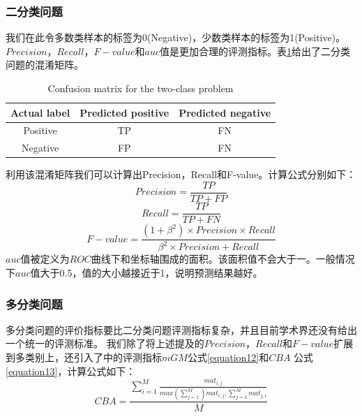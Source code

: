 \documentclass{article}
\begin{document}
\subsubsection{二分类问题}
我们在此令多数类样本的标签为0(Negative)，少数类样本的标签为1(Positive)。
$Precision$，$Recall$，$F-value$和$auc$值是更加合理的评测指标。表\ref{table1}给出了二分类问题的混淆矩阵。
\begin{table}[]
  \caption{Confusion matrix for the two-class problem}
  \label{table1}
  \begin{tabular}{@{}ccc@{}}
  \toprule
  Actual label & \multicolumn{1}{l}{Predicted positive} & \multicolumn{1}{l}{Predicted negative} \\ \midrule
  Positive     & TP                                     & FN                                     \\
  Negative     & FP                                     & FN                                     \\ \bottomrule
  \end{tabular}
  \end{table}
利用该混淆矩阵我们可以计算出Precision，Recall和F-value。计算公式分别如下：
\begin{equation}
  Precision=\frac{TP}{TP+FP}
\end{equation}
\begin{equation}
  Recall=\frac{TP}{TP+FN}
\end{equation}
\begin{equation}
  F-value=\frac{(1+\beta^2) \times Precision \times Recall}{\beta^2 \times Precision+Recall}
\end{equation}
$auc$值被定义为$ROC$曲线下和坐标轴围成的面积。该面积值不会大于一。一般情况下$auc$值大于0.5，值的大小越接近于1，说明预测结果越好。
\subsubsection{多分类问题}
多分类问题的评价指标要比二分类问题评测指标复杂，并且目前学术界还没有给出一个统一的评测标准。
我们除了将上述提及的$Precision$，$Recall$和$F-value$扩展到多类别上，还引入了\cite{2017Relevance}中的评测指标$mGM$公式\ref{equation12}和$CBA$ 公式\ref{equation13}，计算公式如下：
\begin{equation}
  \label{equation12}
  CBA=\frac{\sum_{i=1}^{M}\frac{mat_{i,j}}{max(\sum_{j=1}^M)mat_{i,j},\sum_{j=1}^M mat_{j,i}}}{M}
\end{equation}
\end{document}
